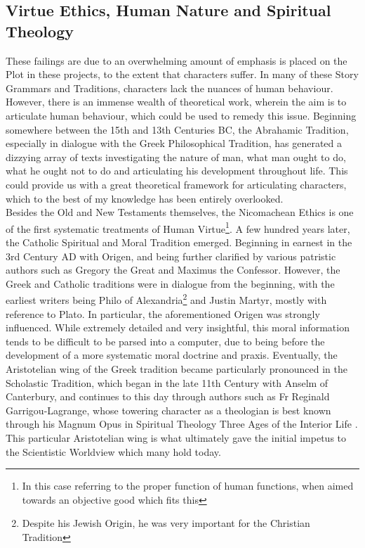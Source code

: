 \documentclass[11pt]{article}
\begin{document}
\subsection{Virtue Ethics, Human Nature and Spiritual Theology}
These failings are due to an overwhelming amount of emphasis is placed on the Plot in these projects, to the extent that characters suffer. In many of these Story Grammars and Traditions, characters lack the nuances of human behaviour. However, there is an immense wealth of theoretical work, wherein the aim is to articulate human behaviour, which could be used to remedy this issue. Beginning somewhere between the 15th and 13th Centuries BC, the Abrahamic Tradition, especially in dialogue with the Greek Philosophical Tradition, has generated a dizzying array of texts investigating the nature of man, what man ought to do, what he ought not to do and articulating his development throughout life. This could provide us with a great theoretical framework for articulating characters, which to the best of my knowledge has been entirely overlooked.\\

Besides the Old and New Testaments themselves, the Nicomachean Ethics \cite{340BCEthicsAristotleNicomachean} is one of the first systematic treatments of Human Virtue\footnote{In this case referring to the proper function of human functions, when aimed towards an objective good which fits this}. A few hundred years later, the Catholic Spiritual and Moral Tradition emerged. Beginning in earnest in the 3rd Century AD with Origen\cite{bergsma2018catholic}, and being further clarified by various patristic authors such as Gregory the Great and Maximus the Confessor. However, the Greek and Catholic traditions were in dialogue from the beginning, with the earliest writers being Philo of Alexandria\footnote{Despite his Jewish Origin, he was very important for the Christian Tradition} and Justin Martyr, mostly with reference to Plato. In particular, the aforementioned Origen was strongly influenced. While extremely detailed and very insightful, this moral information tends to be difficult to be parsed into a computer, due to being before the development of a more systematic moral doctrine and praxis. Eventually, the Aristotelian wing of the Greek tradition became particularly pronounced in the Scholastic Tradition, which began in the late 11th Century with Anselm of Canterbury, and continues to this day through authors such as Fr Reginald Garrigou-Lagrange, whose towering character as a theologian is best known through his Magnum Opus in Spiritual Theology \: Three Ages of the Interior Life \cite{garrigou2013three}. This particular Aristotelian wing is what ultimately gave the initial impetus to the Scientistic Worldview which many hold today.\\
\end{document}
